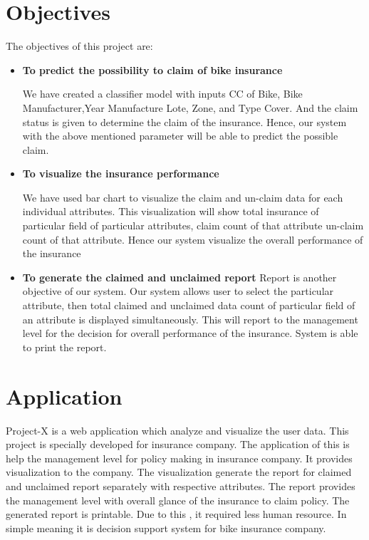 \newpage
\section{Objectives}\label{sec:obj}
The objectives of this project are:
\begin{itemize}
\item \textbf{To predict the possibility to claim of bike insurance}
\par 
\par We have created a classifier model with inputs CC of Bike, Bike Manufacturer,Year Manufacture Lote, Zone, and Type Cover. And the claim status is given to determine the claim of the insurance. Hence, our system with the above mentioned parameter will be able to predict the possible claim.
\item \textbf{To visualize the insurance performance} 
\par 
We have used bar chart to visualize the claim and un-claim data for each individual attributes. This visualization will show total insurance of particular field of particular attributes, claim count of that attribute un-claim count of that attribute. Hence our system visualize the overall performance of the insurance
\item \textbf{To generate the claimed and unclaimed report}
Report is another objective of our system. Our system allows user to select the particular attribute, then total claimed and unclaimed data count of particular field of an attribute is displayed simultaneously. This will report to the management level for the decision for overall performance of the insurance. System is able to print the report.
\end{itemize}

\section{Application}
Project-X is a web application which analyze and visualize the user data. This project is specially developed for insurance company. The application of this is help the  management level for policy making in insurance company. It provides visualization to the company. The visualization generate the report for claimed and unclaimed report separately with respective attributes. The report provides the management level with overall glance of the insurance to claim policy. The generated report is printable. Due to this , it required less human resource. In simple meaning it is decision support system for bike insurance company.

